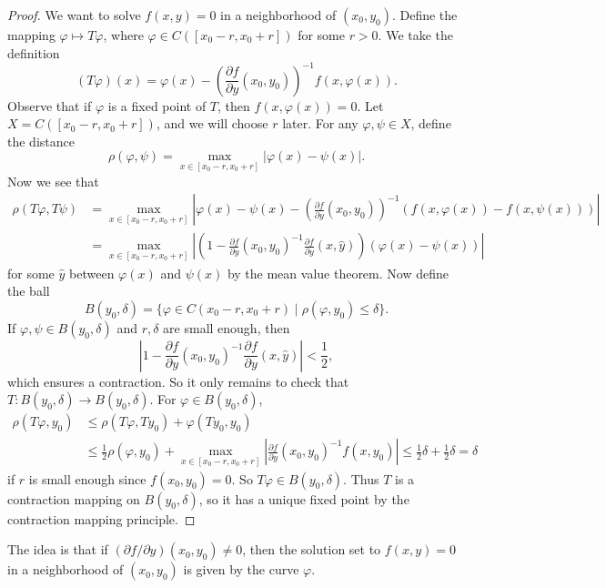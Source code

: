 \begin{proof}
  We want to solve $f(x, y) = 0$ in a neighborhood
  of $(x_0, y_0)$. Define the mapping $\varphi \mapsto T\varphi$,
  where $\varphi \in C([x_0 - r, x_0 + r])$ for
  some $r > 0$. We take the definition
  \[
    (T\varphi)(x) = \varphi(x) - \left(\frac{\partial f}{\partial y}(x_0, y_0)\right)^{-1} f(x, \varphi(x)).
  \]
  Observe that if $\varphi$ is a fixed point of $T$,
  then $f(x, \varphi(x)) = 0$. Let
  $X = C([x_0 - r, x_0 + r])$, and we will choose $r$
  later. For any $\varphi, \psi \in X$, define the
  distance
  \[
    \rho(\varphi, \psi) = \max_{x \in [x_0 - r, x_0 + r]} |\varphi(x) - \psi(x)|.
  \]
  Now we see that
  \begin{align*}
    \rho(T\varphi, T\psi)
    &= \max_{x \in [x_0 - r, x_0 + r]} \left| \varphi(x) - \psi(x) - \left(\frac{\partial f}{\partial y}(x_0, y_0)\right)^{-1} \left(f(x, \varphi(x)) - f(x, \psi(x))\right) \right| \\
    &= \max_{x \in [x_0 - r, x_0 + r]} \left| \left(1 - \frac{\partial f}{\partial y}(x_0, y_0)^{-1} \frac{\partial f}{\partial y}(x, \hat{y})\right) (\varphi(x) - \psi(x)) \right|
  \end{align*}
  for some $\hat{y}$ between $\varphi(x)$ and $\psi(x)$
  by the mean value theorem. Now define the ball
  \[
    B(y_0, \delta) = \{\varphi \in C(x_0 - r, x_0 + r) \mid \rho(\varphi, y_0) \le \delta\}.
  \]
  If $\varphi, \psi \in B(y_0, \delta)$ and
  $r, \delta$ are small enough, then
  \[
    \left|1 - \frac{\partial f}{\partial y}(x_0, y_0)^{-1} \frac{\partial f}{\partial y}(x, \hat{y})\right| < \frac{1}{2},
  \]
  which ensures a contraction.
  So it only remains to check that
  $T : B(y_0, \delta) \to B(y_0, \delta)$. For
  $\varphi \in B(y_0, \delta)$,
  \begin{align*}
    \rho(T\varphi, y_0)
    &\le \rho(T\varphi, Ty_0) + \varphi(Ty_0, y_0) \\
    &\le \frac{1}{2} \rho(\varphi, y_0) + \max_{x \in [x_0 - r, x_0 + r]} \left| \frac{\partial f}{\partial y}(x_0, y_0)^{-1} f(x, y_0) \right|
    \le \frac{1}{2} \delta + \frac{1}{2} \delta
    = \delta
  \end{align*}
  if $r$ is small enough since $f(x_0, y_0) = 0$.
  So $T\varphi \in B(y_0, \delta)$.
  Thus $T$ is a contraction mapping on $B(y_0, \delta)$,
  so it has a unique fixed point by the
  contraction mapping principle.
\end{proof}

\begin{remark}
  The idea is that if $(\partial f / \partial y)(x_0, y_0) \ne 0$, then the solution set to
  $f(x, y) = 0$
  in a neighborhood of $(x_0, y_0)$ is given by the
  curve $\varphi$.
\end{remark}
